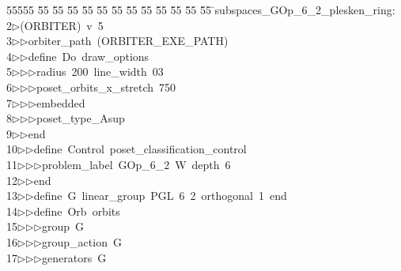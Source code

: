 %
%
\begin{tabbing}
55555 \= 55 \= 55 \= 55 \= 55 \= 55 \= 55 \= 55 \= 55 \= 55 \= 55 \= 55 \= 55 \= \>subspaces\_GOp\_6\_2\_plesken\_ring:\\[0pt]
2\>$\triangleright$\>(ORBITER)\ v\ 5\ \\[0pt]
3\>$\triangleright$\>$\triangleright$\>orbiter\_path\ (ORBITER\_EXE\_PATH)\ \\[0pt]
4\>$\triangleright$\>$\triangleright$\>define\ Do\ draw\_options\ \\[0pt]
5\>$\triangleright$\>$\triangleright$\>$\triangleright$\>radius\ 200\ line\_width\ 03\ \\[0pt]
6\>$\triangleright$\>$\triangleright$\>$\triangleright$\>poset\_orbits\_x\_stretch\ 750\ \\[0pt]
7\>$\triangleright$\>$\triangleright$\>$\triangleright$\>embedded\ \\[0pt]
8\>$\triangleright$\>$\triangleright$\>$\triangleright$\>poset\_type\_Asup\ \\[0pt]
9\>$\triangleright$\>$\triangleright$\>end\ \\[0pt]
10\>$\triangleright$\>$\triangleright$\>define\ Control\ poset\_classification\_control\ \\[0pt]
11\>$\triangleright$\>$\triangleright$\>$\triangleright$\>problem\_label\ GOp\_6\_2\ W\ depth\ 6\ \\[0pt]
12\>$\triangleright$\>$\triangleright$\>end\ \\[0pt]
13\>$\triangleright$\>$\triangleright$\>define\ G\ linear\_group\ PGL\ 6\ 2\ orthogonal\ 1\ end\ \\[0pt]
14\>$\triangleright$\>$\triangleright$\>define\ Orb\ orbits\ \\[0pt]
15\>$\triangleright$\>$\triangleright$\>$\triangleright$\>group\ G\ \\[0pt]
16\>$\triangleright$\>$\triangleright$\>$\triangleright$\>group\_action\ G\ \\[0pt]
17\>$\triangleright$\>$\triangleright$\>$\triangleright$\>generators\ G\ \\[0pt]

\end{tabbing}
